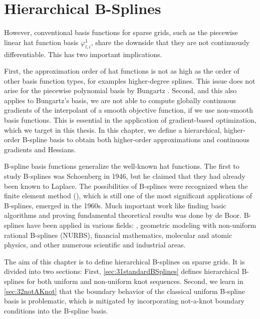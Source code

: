 
\chapter{Hierarchical B-Splines}
\label{chap:30BSplines}





However, conventional basis functions for sparse grids,
such as the piecewise linear hat function basis $\varphi_{l,i}^1$,
share the downside that they are not continuously differentiable.
This has two important implications.

First, the approximation order of hat functions
is not as high as the order of other basis function types,
for examples higher-degree splines.
This issue does not arise for the piecewise polynomial basis
by Bungartz \cite{Bungartz98Finite}.
Second, and this also applies to Bungartz's basis,
we are not able to compute globally continuous gradients of the
interpolant of a smooth objective function,
if we use non-smooth basis functions.
This is essential in the application of gradient-based optimization,
which we target in this thesis.
In this chapter, we define a hierarchical, higher-order B-spline basis
to obtain both higher-order approximations
and continuous gradients and Hessians.

B-spline basis functions generalize the well-known hat functions.
The first to study B-splines was Schoenberg in 1946,
but he claimed that they had already been known to Laplace.
%
The possibilities of B-splines were recognized when
the finite element method (\fem),
which is still one of the most significant applications of B-splines,
emerged in the 1960s.
Much important work like finding basic algorithms and proving fundamental
theoretical results was done by de Boor.
B-splines have been applied in various fields:
\fem,
geometric modeling with non-uniform rational B-splines (NURBS),
financial mathematics,
molecular and atomic physics,
and other numerous scientific and industrial areas.

The aim of this chapter is to define hierarchical B-splines on sparse grids.
It is divided into two sections:
First, \cref{sec:31standardBSplines} defines hierarchical B-splines for both
uniform and non-uniform knot sequences.
Second, we learn in \cref{sec:32notAKnot} that the boundary behavior
of the classical uniform B-spline basis is problematic,
which is mitigated by incorporating not-a-knot boundary conditions
into the B-spline basis.






\cleardoublepage
